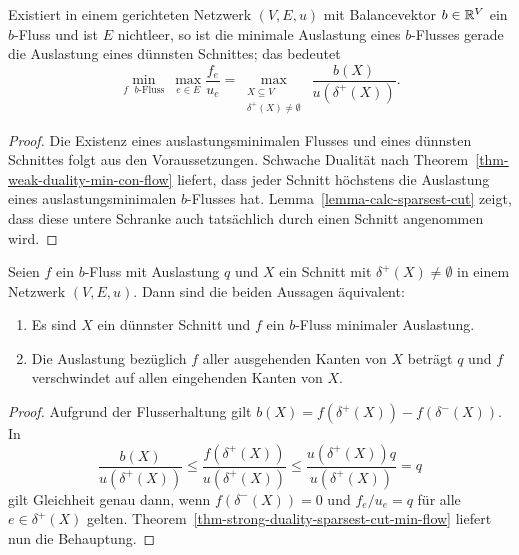 \begin{theorem}\label{thm-strong-duality-sparsest-cut-min-flow}
	Existiert in einem gerichteten Netzwerk $(V, E, u)$ mit Balancevektor $b\in\mathbb{R}^V$ ein $b$-Fluss und ist $E$ nichtleer, so ist die minimale Auslastung eines $b$-Flusses gerade die Auslastung eines dünnsten Schnittes; das bedeutet
	\[
	\min_{\text{$f$ $b$-Fluss}}~\max_{e\in E}\frac{f_e}{u_e} = \max_{\substack{X\subseteq V\\ \delta^+(X)\neq\emptyset}} ~ \frac{b(X)}{u(\delta^+(X))}.
	\]
\end{theorem}
\begin{proof}
	Die Existenz eines auslastungsminimalen Flusses und eines dünnsten Schnittes folgt aus den Voraussetzungen.
	Schwache Dualität nach Theorem~\ref{thm-weak-duality-min-con-flow} liefert, dass jeder Schnitt höchstens die Auslastung eines auslastungsminimalen $b$-Flusses hat.
	Lemma~\ref{lemma-calc-sparsest-cut} zeigt, dass diese untere Schranke auch tatsächlich durch einen Schnitt angenommen wird.
\end{proof}

\begin{corollary}\label{cor-easy-characterization-sparsest-cut}
	Seien $f$ ein $b$-Fluss mit Auslastung $q$ und $X$ ein Schnitt mit $\delta^+(X)\neq \emptyset$ in einem Netzwerk $(V, E, u)$.
	Dann sind die beiden Aussagen äquivalent:
	\begin{enumerate}[label=(\roman*)]
		\item Es sind $X$ ein dünnster Schnitt und $f$ ein $b$-Fluss minimaler Auslastung.
		\item Die Auslastung bezüglich $f$ aller ausgehenden Kanten von $X$ beträgt $q$ und $f$ verschwindet auf allen eingehenden Kanten von $X$.
	\end{enumerate}
\end{corollary}
\begin{proof}
	Aufgrund der Flusserhaltung gilt $b(X) = f(\delta^+(X)) - f(\delta^-(X))$.
	In \[
	\frac{b(X)}{u(\delta^+(X))} \leq \frac{f(\delta^+(X))}{u(\delta^+(X))} \leq \frac{u(\delta^+(X)) q}{u(\delta^+(X))} = q
	\]
	gilt Gleichheit genau dann, wenn $f(\delta^-(X))=0$ und $f_{e}/u_{e} = q$ für alle $e\in\delta^+(X)$ gelten.
	Theorem~\ref{thm-strong-duality-sparsest-cut-min-flow} liefert nun die Behauptung.
\end{proof}


